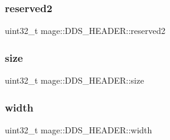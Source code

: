 \hypertarget{structmage_1_1_d_d_s___h_e_a_d_e_r_abb51770a073353c831a802fda3f72d5c}{}\label{structmage_1_1_d_d_s___h_e_a_d_e_r_abb51770a073353c831a802fda3f72d5c} 
\subsubsection{\texorpdfstring{reserved2}{reserved2}}
{\footnotesize\ttfamily uint32\+\_\+t mage\+::\+D\+D\+S\+\_\+\+H\+E\+A\+D\+E\+R\+::reserved2}

\hypertarget{structmage_1_1_d_d_s___h_e_a_d_e_r_a6482c2116e359d2192e7e9f9b9bade94}{}\label{structmage_1_1_d_d_s___h_e_a_d_e_r_a6482c2116e359d2192e7e9f9b9bade94} 
\subsubsection{\texorpdfstring{size}{size}}
{\footnotesize\ttfamily uint32\+\_\+t mage\+::\+D\+D\+S\+\_\+\+H\+E\+A\+D\+E\+R\+::size}

\hypertarget{structmage_1_1_d_d_s___h_e_a_d_e_r_af85eb50a0cb1ba682ebd47fd8f009156}{}\label{structmage_1_1_d_d_s___h_e_a_d_e_r_af85eb50a0cb1ba682ebd47fd8f009156} 
\subsubsection{\texorpdfstring{width}{width}}
{\footnotesize\ttfamily uint32\+\_\+t mage\+::\+D\+D\+S\+\_\+\+H\+E\+A\+D\+E\+R\+::width}

